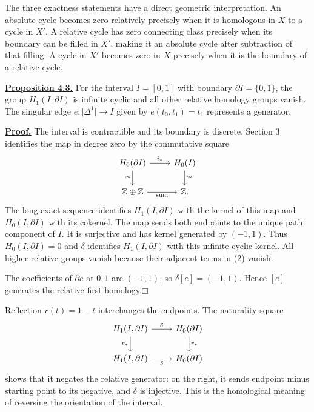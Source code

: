 \documentclass[11pt]{article}
\newcommand{\coursebold}[1]{{\color{burgundy}\textbf{#1}}}
\newcommand{\facecase}[1]{\par\Needspace{4\baselineskip}\smallskip\coursebold{#1.}\par}
\begin{document}
The three exactness statements have a direct geometric interpretation. An absolute cycle becomes zero relatively precisely when it is homologous in $X$ to a cycle in $X'$. A relative cycle has zero connecting class precisely when its boundary can be filled in $X'$, making it an absolute cycle after subtraction of that filling. A cycle in $X'$ becomes zero in $X$ precisely when it is the boundary of a relative cycle.

\facecase{The Interval and Its Endpoints}
\hypertarget{prop33}{}\coursebold{\hyperlink{proof33}{Proposition 4.3.}} For the interval $I=[0,1]$ with boundary $\partial I=\{0,1\}$, the group $H_1(I,\partial I)$ is infinite cyclic and all other relative homology groups vanish. The singular edge $e:\lvert\Delta^1\rvert\to I$ given by $e(t_0,t_1)=t_1$ represents a generator.

\hypertarget{proof33}{}\coursebold{\hyperlink{prop33}{Proof.}} The interval is contractible and its boundary is discrete. Section 3 identifies the map in degree zero by the commutative square
\[
\begin{tikzcd}
H_0(\partial I)\arrow[r,"i_*"]\arrow[d,"\cong"']&H_0(I)\arrow[d,"\cong"]\\
\mathbb Z\oplus\mathbb Z\arrow[r,"\mathrm{sum}"']&\mathbb Z.
\end{tikzcd}
\]
The long exact sequence identifies $H_1(I,\partial I)$ with the kernel of this map and $H_0(I,\partial I)$ with its cokernel. The map sends both endpoints to the unique path component of $I$. It is surjective and has kernel generated by $(-1,1)$. Thus $H_0(I,\partial I)=0$ and $\delta$ identifies $H_1(I,\partial I)$ with this infinite cyclic kernel. All higher relative groups vanish because their adjacent terms in (2) vanish.

The coefficients of $\partial e$ at $0,1$ are $(-1,1)$, so $\delta[e]=(-1,1)$. Hence $[e]$ generates the relative first homology.\hfill$\mdlgwhtsquare$

Reflection $r(t)=1-t$ interchanges the endpoints. The naturality square
\[
\begin{tikzcd}
H_1(I,\partial I)\arrow[r,"\delta"]\arrow[d,"r_*"']&H_0(\partial I)\arrow[d,"r_*"]\\
H_1(I,\partial I)\arrow[r,"\delta"']&H_0(\partial I)
\end{tikzcd}
\]
shows that it negates the relative generator: on the right, it sends endpoint minus starting point to its negative, and $\delta$ is injective. This is the homological meaning of reversing the orientation of the interval.
\end{document}
